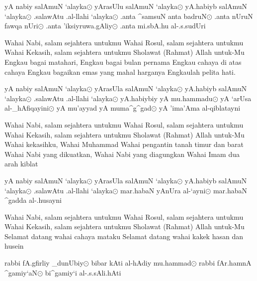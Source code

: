 \documentclass[a4paper,12pt,makeidx]{article}
\begin{document}
\vspace{1cm}
\begin{arabtext}
yA nabiy salAmuN `alayka$\odot$
yArasUlu salAmuN `alayka$\odot$
yA.habiyb salAmuN `alayka$\odot$
.salawAtu .al-llahi `alayka$\odot$
.anta ^samsuN anta badruN$\odot$
.anta nUruN fawqa nUri$\odot$
.anta 'iksiyruwa.gAliy$\odot$
.anta mi.sbA.hu al-.s.sudUri
\end{arabtext}

\vspace{0.5cm}
Wahai Nabi, salam sejahtera untukmu
Wahai Rosul, salam sejahtera untukmu
Wahai Kekasih, salam sejahtera untukmu
Sholawat (Rahmat) Allah untuk-Mu
Engkau bagai matahari, Engkau bagai bulan pernama
Engkau cahaya di atas cahaya
Engkau bagaikan emas yang mahal harganya
Engkaulah pelita hati.

\vspace{0.5cm}
\begin{arabtext}
yA nabiy salAmuN `alayka$\odot$
yArasUla salAmuN `alayka$\odot$
yA.habiyb salAmuN `alayka$\odot$
.salawAtu .al-llahi `alayka$\odot$
yA.habiybiy yA mu.hammadu$\odot$
yA `arUsa al-_hAfiqayini$\odot$
yA mu'ayyad yA muma^g^gad$\odot$
yA 'ima'Ama al-qiblatayni
\end{arabtext}

\vspace{0.5cm}
Wahai Nabi, salam sejahtera untukmu
Wahai Rosul, salam sejahtera untukmu
Wahai Kekasih, salam sejahtera untukmu
Sholawat (Rahmat) Allah untuk-Mu
Wahai kekasihku, Wahai Muhammad
Wahai pengantin tanah timur dan barat
Wahai Nabi yang dikuatkan, Wahai Nabi yang diagungkan
Wahai Imam dua arah kiblat

\vspace{1cm}
\begin{arabtext}
yA nabiy salAmuN `alayka$\odot$
yArasUla salAmuN `alayka$\odot$
yA.habiyb salAmuN `alayka$\odot$
.salawAtu .al-llahi `alayka$\odot$
mar.habaN yAnUra al-`ayni$\odot$
mar.habaN ^gadda al-.husayni
\end{arabtext}

\vspace{0.5cm}
Wahai Nabi, salam sejahtera untukmu
Wahai Rosul, salam sejahtera untukmu
Wahai Kekasih, salam sejahtera untukmu
Sholawat (Rahmat) Allah untuk-Mu
Selamat datang wahai cahaya mataku
Selamat datang wahai kakek hasan dan husein

\vspace{1cm}
\begin{arabtext}
rabbi fA.gfirliy _dunUbiy$\odot$
bibar kAti al-hAdiy mu.hammad$\odot$
rabbi fAr.hamnA ^gamiy`aN$\odot$
bi^gamiy`i al-.s.sAli.hAti
\end{arabtext}
\end{document}
